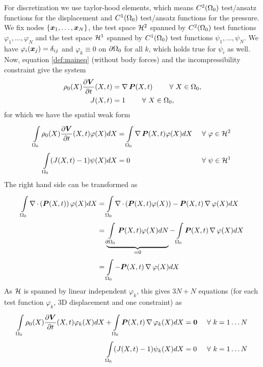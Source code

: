 For discretization we use taylor-hood elements, which means $C^2(\Omega_0)$ test/ansatz functions for the displacement and $C^1(\Omega_0)$ test/ansatz functions for
the pressure.
We fix nodes $\{\boldsymbol{x}_1,\ldots,\boldsymbol{x}_N\}$, the test space $\mathcal{H}^2$ spanned by $C^2(\Omega_0)$ test functions
$\varphi_1,\ldots,\varphi_N$ and the test space $\mathcal{H}^1$ spanned by $C^1(\Omega_0)$ test functions
$\psi_1,\ldots,\psi_N$. 
We have $\varphi_i(\boldsymbol{x}_j) = \delta_{ij}$ and $\varphi_k \equiv 0$ on $\partial\Omega_0$ for all $k$, which holds true for $\psi_i$ as well.
Now, equation \eqref{def:maineq} (without body forces) and the incompressibility constraint give the system 
\begin{align}
	\rho_0(X)\frac{\partial \boldsymbol{V}}{\partial t}(X,t) &= \operatorname{\nabla}\boldsymbol{P}(X,t) \qquad ~\forall~ X\in\Omega_0,\\
	J(X,t) &= 1 \qquad ~\forall~ X\in\Omega_0,
\end{align}
for which we have the spatial weak form
\begin{align}
	\int\limits_{\Omega_0}^{}\rho_0(X)\frac{\partial \boldsymbol{V}}{\partial t}(X,t)\varphi(X)dX &= \int\limits_{\Omega_0}^{}\operatorname{\nabla}\boldsymbol{P}(X,t)\varphi(X)dX &&~\forall~ \varphi\in\mathcal{H}^2\\
	\int\limits_{\Omega_0}^{} (J(X,t)-1)\psi(X)dX &= 0 && ~\forall~ \psi\in\mathcal{H}^1
\end{align}
The right hand side can be transformed as
\begin{align*}
	\int\limits_{\Omega_0}^{} \operatorname{\nabla}\cdot\left(\boldsymbol{P}(X,t)\right)\varphi(X) dX &= \int\limits_{\Omega_0}^{} \operatorname{\nabla}\cdot\left(\boldsymbol{P}(X,t)\varphi(X)\right) - \boldsymbol{P}(X,t)\operatorname{\nabla}\varphi(X) dX\\
		 &= \underbrace{\int\limits_{\partial\Omega_0}^{} \boldsymbol{P}(X,t)\varphi(X) dN}_{=0} - \int\limits_{\Omega_0}^{} \boldsymbol{P}(X,t)\operatorname{\nabla}\varphi(X)dX\\
		 &= \int\limits_{\Omega_0}^{} -\boldsymbol{P}(X,t)\operatorname{\nabla}\varphi(X) dX
\end{align*}
As $\mathcal{H}$ is spanned by linear independent $\varphi_k$,
this gives $3N+N$ equations (for each test function $\varphi_k$, 3D displacement and one constraint) as
\begin{align}
	\int\limits_{\Omega_0}^{} \rho_0(X)\frac{\partial \boldsymbol{V}}{\partial t}(X,t)\varphi_k(X)dX + \int\limits_{\Omega_0}^{}\boldsymbol{P}(X,t)\operatorname{\nabla}\varphi_k(X) dX &= \boldsymbol{0} && ~\forall~ k=1\ldots N\label{def:weakform}\\
	\int\limits_{\Omega_0}^{} (J(X,t)-1)\psi_k(X)dX &= 0 && ~\forall~ k=1\ldots N\label{def:weakform_nb}
\end{align}

